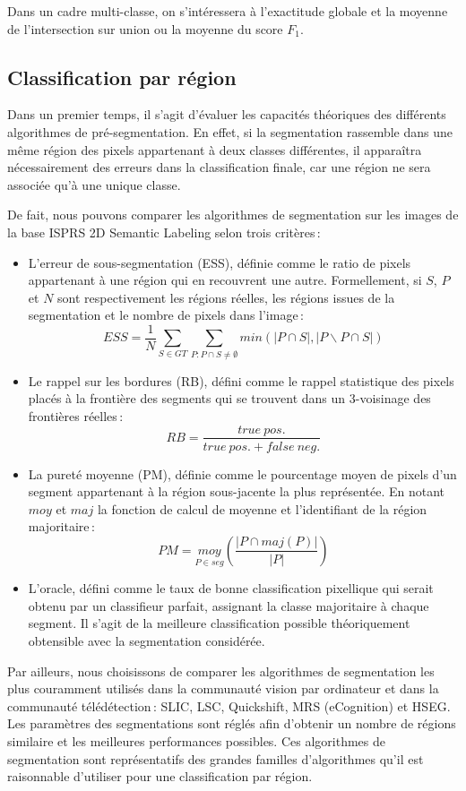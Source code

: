 Dans un cadre multi-classe, on s'intéressera à l'exactitude globale et la moyenne de l'intersection sur union ou la moyenne du score $F_1$.

\subsection{Classification par région}

Dans un premier temps, il s'agit d'évaluer les capacités théoriques des différents algorithmes de pré-segmentation. En effet, si la segmentation rassemble dans une même région des pixels appartenant à deux classes différentes, il apparaîtra nécessairement des erreurs dans la classification finale, car une région ne sera associée qu'à une unique classe.

De fait, nous pouvons comparer les algorithmes de segmentation sur les images de la base ISPRS 2D Semantic Labeling selon trois critères\,:
\begin{itemize}
  \item L'erreur de sous-segmentation (ESS), définie comme le ratio de pixels appartenant à une région qui en recouvrent une autre. Formellement, si $S$, $P$ et $N$ sont respectivement les régions réelles, les régions issues de la segmentation et le nombre de pixels dans l'image\,:
$$ESS = \frac{1}{N} \sum_{S \in GT} \sum_{P : P \cap S \neq \emptyset} min(|P \cap S|, |P \backslash P \cap S|)$$
  \item Le rappel sur les bordures (RB), défini comme le rappel statistique des pixels placés à la frontière des segments qui se trouvent dans un 3-voisinage des frontières réelles\,:
$$RB =  \frac{true\ pos.}{true\ pos. + false\ neg.}$$
  \item La pureté moyenne (PM), définie comme le pourcentage moyen de pixels d'un segment appartenant à la région sous-jacente la plus représentée. En notant $moy$ et $maj$ la fonction de calcul de moyenne et l'identifiant de la région majoritaire\,:
$$PM = \underset{P \in seg}{moy} \left(\frac{| P \cap maj(P)|}{| P |}\right)$$
  \item L'oracle, défini comme le taux de bonne classification pixellique qui serait obtenu par un classifieur parfait, assignant la classe majoritaire à chaque segment. Il s'agit de la meilleure classification possible théoriquement obtensible avec la segmentation considérée.
\end{itemize}

Par ailleurs, nous choisissons de comparer les algorithmes de segmentation les plus couramment utilisés dans la communauté vision par ordinateur et dans la communauté télédétection\,: \gls{SLIC}, \gls{LSC}, Quickshift, \gls{MRS} (eCognition) et \gls{HSEG}. Les paramètres des segmentations sont réglés afin d'obtenir un nombre de régions similaire et les meilleures performances possibles. Ces algorithmes de segmentation sont représentatifs des grandes familles d'algorithmes qu'il est raisonnable d'utiliser pour une classification par région.

